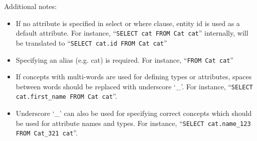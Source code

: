 %
%

Additional notes:
\begin{itemize}
\item If no attribute is specified in select or where clause, entity id is used as a default attribute. For instance, 
``\texttt{SELECT cat FROM Cat cat}'' internally, will be translated to ``\texttt{SELECT cat.id FROM Cat cat}''

\item Specifying an alias (e.g. cat) is required. For instance, ``\texttt{FROM Cat cat}''

\item If concepts with multi-words are used for defining types or attributes, spaces between words should be replaced with underscore `\_'. For instance, ``\texttt{SELECT cat.first\_name FROM Cat cat}''.

\item Underscore `\_' can also be used for specifying correct concepts which should be used for attribute names and types. For instance, ``\texttt{SELECT cat.name\_123 FROM Cat\_321 cat}''.
\end{itemize}



